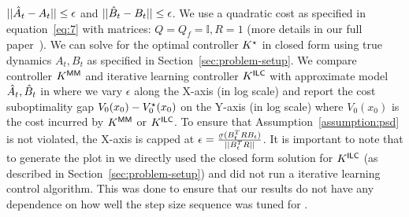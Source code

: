 $||\hat{A}_{t} - A_{t}|| \leq \epsilon$ and $||\hat{B}_{t} - B_{t}|| \leq \epsilon$.
We use a quadratic cost as specified in equation~\ref{eq:7} with matrices:
  $Q = Q_{f} = \mathbb{I}, R = 1$ (more details in our full paper~\cite{DBLP:journals/corr/abs-2111-09434}).
We can solve for the optimal controller $K^\star$ in closed form using true
dynamics $A_{t}, B_{t}$ as specified in Section~\ref{sec:problem-setup}. We compare
\MM{} controller $K^\mathsf{MM}$ 
and iterative learning controller $K^\mathsf{ILC}$ with approximate model
$\hat{A}_{t}, \hat{B}_{t}$ in  where we vary $\epsilon$ along
the X-axis (in log scale) and report the cost suboptimality gap
$V_{0}(x_{0}) - V^\star_{0}(x_{0})$ on the Y-axis
(in log scale) where $V_{0}(x_{0})$ is the cost incurred by $K^\mathsf{MM}$ or $K^\mathsf{ILC}$.
To ensure that
Assumption~\ref{assumption:psd} is not violated, the X-axis is capped at
$\epsilon = \frac{\ubar{\sigma}(B_{t}^{T}RB_{t})}{||B_{t}^{T}R||}$.
It is important to note that to generate the plot in  we
directly used the closed form solution for $K^\mathsf{ILC}$ (as described in
Section~\ref{sec:problem-setup}) and did not run a iterative learning control
algorithm. This was done to ensure that our results do not have any dependence
on how well the step size sequence was tuned for \ILC{}.

